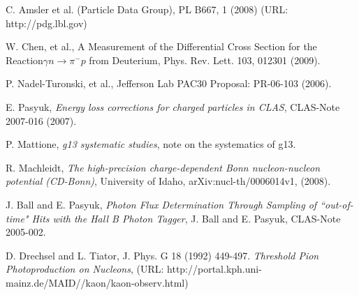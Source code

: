 \documentclass[prb,10pt,twocolumn,tightenlines,superscriptaddress]{revtex4-1}
\begin{document}
\begin{thebibliography}{5}
		C. Amsler et al. 
		(Particle Data Group), PL B667, 1 (2008) 
		(URL: http://pdg.lbl.gov)   
        
		W. Chen, et al., 
		A Measurement of the Differential Cross Section for the Reaction$\gamma n \longrightarrow \pi^{-}p$ from Deuterium,
		Phys. Rev. Lett. 103, 012301 (2009).

        P. Nadel-Turonski, et al.,
        Jefferson Lab PAC30 Proposal: PR-06-103 (2006). 

        E. Pasyuk,
        {\em Energy loss corrections for charged particles in CLAS},
        CLAS-Note 2007-016 (2007).

        P. Mattione,
        \emph{g13 systematic studies},
        note on the systematics of g13.

        R. Machleidt,
        {\em The high-precision charge-dependent Bonn nucleon-nucleon potential (CD-Bonn)},
        University of Idaho, arXiv:nucl-th/0006014v1, (2008).

        J. Ball and E. Pasyuk,
        \emph{Photon Flux Determination Through Sampling of ``out-of-time" Hits with the Hall B Photon Tagger},
        J. Ball and E. Pasyuk,
        CLAS-Note 2005-002.
        
        D. Drechsel and L. Tiator, J. Phys. G 18 (1992) 449-497.
        {\em Threshold Pion Photoproduction on Nucleons}, 
        (URL: http://portal.kph.uni-mainz.de/MAID//kaon/kaon-observ.html)

\end{thebibliography}
\end{document}
